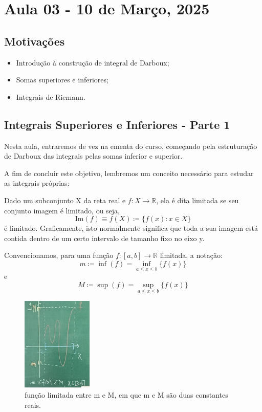 \documentclass[../analysisII_notes.tex]{subfiles}
\begin{document}
\section{Aula 03 - 10 de Março, 2025}
\subsection{Motivações}
\begin{itemize}
	\item Introdução à construção de integral de Darboux;
	\item Somas superiores e inferiores;
	\item Integrais de Riemann.
\end{itemize}
\subsection{Integrais Superiores e Inferiores - Parte 1}
Nesta aula, entraremos de vez na ementa do curso, começando pela estruturação de Darboux das integrais pelas somas inferior e superior.

A fim de concluir este objetivo, lembremos um conceito necessário para estudar as integrais próprias:
\begin{tcolorbox}[
		skin=enhanced,
		title=Lembrete!,
		after title={\hfill Imagem de Função},
		fonttitle=\bfseries,
		sharp corners=downhill,
		colframe=black,
		colbacktitle=yellow!75!white,
		colback=yellow!30,
		colbacklower=black,
		coltitle=black,
		drop large lifted shadow
	]
	Dado um subconjunto X da reta real e \(f:X\rightarrow \mathbb{R}\), ela é dita limitada se seu conjunto imagem é limitado, ou seja,
	\[
		\mathrm{Im}(f) \equiv f(X) \coloneqq \{f(x):x \in X\}
	\]
	é limitado. Graficamente, isto normalmente significa que toda a sua imagem está contida dentro de um certo intervalo de tamanho fixo no eixo y.
\end{tcolorbox}

Convencionamos, para uma função \(f:[a, b]\rightarrow \mathbb{R}\) limitada, a notação:
\[
	m\coloneqq \inf_{}(f) = \inf_{a\leq x\leq b}\{f(x)\}
\]
e
\[
	M\coloneqq \sup_{}(f) = \sup_{a\leq x\leq b}\{f(x)\}
\]

\begin{figure}[H]
	\begin{center}
		\includegraphics[height=0.3\textheight, width=0.3\textwidth, keepaspectratio]{./Images/bounded_03.png}
	\end{center}
	\caption{função limitada entre m e M, em que m e M são duas constantes reais.}
	\label{bdd03}
\end{figure}
\end{document}
